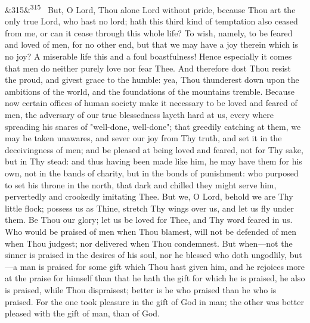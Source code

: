 \documentclass[12pt]{article}
\newcommand{\para}[1][]{\par\noindent\ifx&#1&\else\textsuperscript{\footnotesize #1}~\fi}
\begin{document}
\para[315] But, O Lord, Thou alone Lord without pride, because Thou art the only true Lord, who hast no lord; hath this third kind of temptation also ceased from me, or can it cease through this whole life? To wish, namely, to be feared and loved of men, for no other end, but that we may have a joy therein which is no joy? A miserable life this and a foul boastfulness! Hence especially it comes that men do neither purely love nor fear Thee. And therefore dost Thou resist the proud, and givest grace to the humble: yea, Thou thunderest down upon the ambitions of the world, and the foundations of the mountains tremble. Because now certain offices of human society make it necessary to be loved and feared of men, the adversary of our true blessedness layeth hard at us, every where spreading his snares of "well-done, well-done"; that greedily catching at them, we may be taken unawares, and sever our joy from Thy truth, and set it in the deceivingness of men; and be pleased at being loved and feared, not for Thy sake, but in Thy stead: and thus having been made like him, he may have them for his own, not in the bands of charity, but in the bonds of punishment: who purposed to set his throne in the north, that dark and chilled they might serve him, pervertedly and crookedly imitating Thee. But we, O Lord, behold we are Thy little flock; possess us as Thine, stretch Thy wings over us, and let us fly under them. Be Thou our glory; let us be loved for Thee, and Thy word feared in us. Who would be praised of men when Thou blamest, will not be defended of men when Thou judgest; nor delivered when Thou condemnest. But when---not the sinner is praised in the desires of his soul, nor he blessed who doth ungodlily, but---a man is praised for some gift which Thou hast given him, and he rejoices more at the praise for himself than that he hath the gift for which he is praised, he also is praised, while Thou dispraisest; better is he who praised than he who is praised. For the one took pleasure in the gift of God in man; the other was better pleased with the gift of man, than of God.
\end{document}
